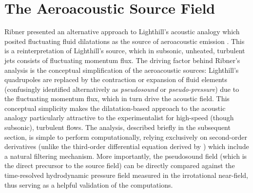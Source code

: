 \section{The Aeroacoustic Source Field}
\label{sect:source}
Ribner presented an alternative approach to Lighthill's acoustic analogy which posited fluctuating fluid dilatations as the source of aeroacoustic emission \citep{Ribner1962}.
This is a reinterpretation of Lighthill's source, which in subsonic, unheated, turbulent jets consists of fluctuating momentum flux.
The driving factor behind Ribner's analysis is the conceptual simplification of the aeroacoustic sources: Lighthill's quadrupoles are replaced by the contraction or expansion of fluid elements (confusingly identified alternatively as \emph{pseudosound} or \emph{pseudo-pressure}) due to the fluctuating momentum flux, which in turn drive the acoustic field.
This conceptual simplicity makes the dilatation-based approach to the acoustic analogy particularly attractive to the experimentalist for high-speed (though subsonic), turbulent flows.
The analysis, described briefly in the subsequent section, is simple to perform computationally, relying exclusively on second-order derivatives (unlike the third-order differential equation derived by \citet{Lilley2003}) which include a natural filtering mechanism.
More importantly, the pseudosound field (which is the direct precursor to the source field) can be directly compared against the time-resolved hydrodynamic pressure field measured in the irrotational near-field, thus serving as a helpful validation of the computations.


